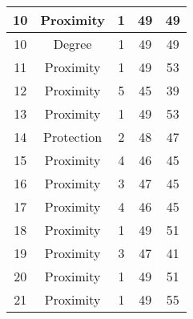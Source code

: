 \documentclass[results.tex]{subfiles}
\begin{document}
\begin{center}
\begin{tabular}{| c || c | c | c | c |}
            \hline
            10                      & Proximity                    & 1                      & 49                      & 49                   \\
            \hline
            10                      & Degree                       & 1                      & 49                      & 49                   \\
            \hline
            11                      & Proximity                    & 1                      & 49                      & 53                   \\
            \hline
            12                      & Proximity                    & 5                      & 45                      & 39                   \\
            \hline
            13                      & Proximity                    & 1                      & 49                      & 53                   \\
            \hline
            14                      & Protection                   & 2                      & 48                      & 47                   \\
            \hline
            15                      & Proximity                    & 4                      & 46                      & 45                   \\
            \hline
            16                      & Proximity                    & 3                      & 47                      & 45                   \\
            \hline
            17                      & Proximity                    & 4                      & 46                      & 45                   \\
            \hline
            18                      & Proximity                    & 1                      & 49                      & 51                   \\
            \hline
            19                      & Proximity                    & 3                      & 47                      & 41                   \\
            \hline
            20                      & Proximity                    & 1                      & 49                      & 51                   \\
            \hline
            21                      & Proximity                    & 1                      & 49                      & 55                   \\

\end{tabular}
\end{center}
\end{document}
